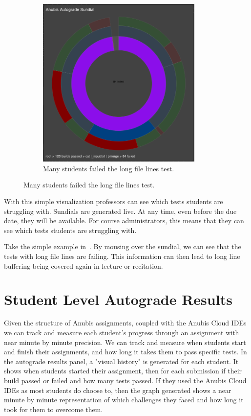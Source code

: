 \begin{figure}[ht]
\begin{subfigure}{0.5\textwidth}
        \includegraphics[width=0.9\textwidth]{figures/sundial-3.png}
        \caption{Many students failed the long file lines test.\label{fig:autograde-sundial-3} }
    \end{subfigure}
\end{figure}

With this simple visualization professors can see which tests students are struggling with.
Sundials are generated live.
At any time, even before the due date, they will be available.
For course administrators, this means that they can see which tests students are struggling with.


Take the simple example in~.
By mousing over the sundial, we can see that the tests with long file lines are failing.
This information can then lead to long line buffering being covered again in lecture or
recitation.

\section{Student Level Autograde Results}\label{sec:student-level-results}

Given the structure of Anubis assignments, coupled with the Anubis Cloud IDEs we can
track and measure each student's progress through an assignment with near minute by minute precision.
We can track and measure when students start and finish their assignments,
and how long it takes them to pass specific tests.
In the autograde results panel, a "visual history" is generated for each student.
It shows when students started their assignment, then for each submission if their
build passed or failed and how many tests passed.
If they used the Anubis Cloud IDEs as most students do choose to,
then the graph generated shows a near minute by minute representation of which
challenges they faced and how long it took for them to overcome them.

